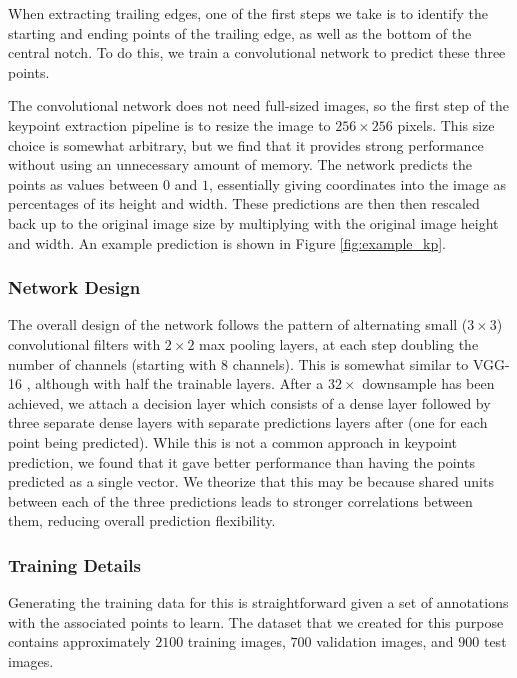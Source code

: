 When extracting trailing edges, one of the first steps we take is to identify the starting and ending points of the trailing edge, as well as the bottom of the central notch.
To do this, we train a convolutional network to predict these three points.

The convolutional network does not need full-sized images, so the first step of the keypoint extraction pipeline is to resize the image to $256 \times 256$ pixels.
This size choice is somewhat arbitrary, but we find that it provides strong performance without using an unnecessary amount of memory.
The network predicts the points as values between $0$ and $1$, essentially giving coordinates into the image as percentages of its height and width. 
These predictions are then then rescaled back up to the original image size by multiplying with the original image height and width.
An example prediction is shown in Figure \ref{fig:example_kp}.

\subsubsection{Network Design}

The overall design of the network follows the pattern of alternating small ($3 \times 3$) convolutional filters with $2 \times 2$ max pooling layers, at each step doubling the number of channels (starting with $8$ channels).
This is somewhat similar to VGG-16 \cite{simonyan2014very}, although with half the trainable layers.
After a $32\times$ downsample has been achieved, we attach a decision layer which consists of a dense layer followed by three separate dense layers with separate predictions layers after (one for each point being predicted).
While this is not a common approach in keypoint prediction, we found that it gave better performance than having the points predicted as a single vector.
We theorize that this may be because shared units between each of the three predictions leads to stronger correlations between them, reducing overall prediction flexibility.

\subsubsection{Training Details}

Generating the training data for this is straightforward given a set of annotations with the associated points to learn.
The dataset that we created for this purpose contains approximately $2100$ training images, $700$ validation images, and $900$ test images.

